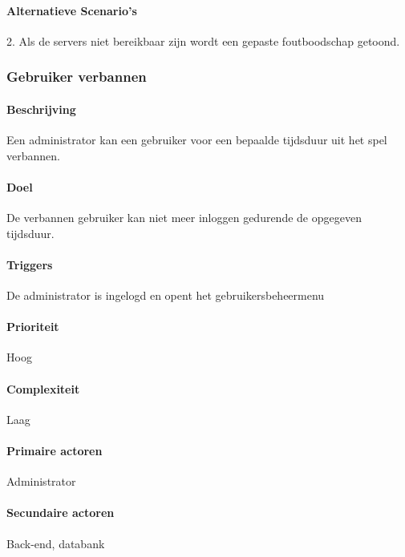 \begin{compact}
\paragraph{Alternatieve Scenario's}
\begin{enumerate_compact}
	\item[2.] Als de servers niet bereikbaar zijn wordt een gepaste foutboodschap getoond.
\end{enumerate_compact}
\end{compact}

\subsubsection{Gebruiker verbannen}
\begin{compact}
\paragraph{Beschrijving} Een administrator kan een gebruiker voor een bepaalde tijdsduur uit het spel verbannen.
\paragraph{Doel} De verbannen gebruiker kan niet meer inloggen gedurende de opgegeven tijdsduur.
\paragraph{Triggers}De administrator is ingelogd en opent het gebruikersbeheermenu
\paragraph{Prioriteit}Hoog
\paragraph{Complexiteit}Laag
\paragraph{Primaire actoren}Administrator
\paragraph{Secundaire actoren}Back-end, databank

\end{compact}
